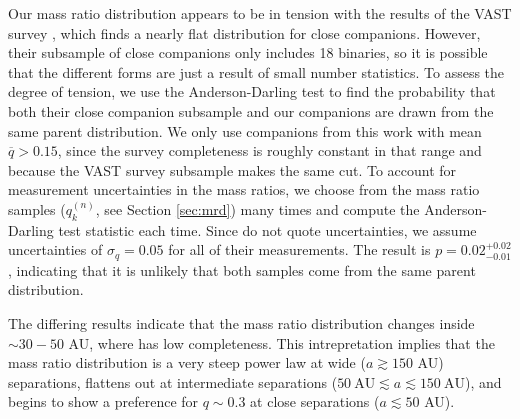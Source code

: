 \documentclass{emulateapj}
\begin{document}
Our mass ratio distribution appears to be in tension with the results of the VAST survey \citep{DeRosa2014}, which finds a nearly flat distribution for close companions. However, their subsample of close companions only includes 18 binaries, so it is possible that the different forms are just a result of small number statistics. To assess the degree of tension, we use the Anderson-Darling  test \citep{Anderson1954} to find the probability that both their close companion subsample and our companions are drawn from the same parent distribution. We only use companions from this work with mean $\overline{q} > 0.15$, since the survey completeness is roughly constant in that range and because the VAST survey subsample makes the same cut. To account for measurement uncertainties in the mass ratios, we choose from the mass ratio samples ($q_k^{(n)}$, see Section \ref{sec:mrd}) many times and compute the Anderson-Darling test statistic each time. Since \citet{DeRosa2014} do not quote uncertainties, we assume uncertainties of $\sigma_q = 0.05$ for all of their measurements. The result is $p = 0.02^{+0.02}_{-0.01}$, indicating that it is unlikely that both samples come from the same parent distribution.

The differing results indicate that the mass ratio distribution changes inside $\sim 30-50$ AU, where \citet{DeRosa2014} has low completeness. This intrepretation implies that the mass ratio distribution is a very steep power law at wide ($a \gtrsim 150$ AU) separations, flattens out at intermediate separations ($50\ \mathrm{AU} \lesssim a \lesssim 150\ \mathrm{AU}$), and begins to show a preference for $q \sim 0.3$ at close separations ($a \lesssim 50$ AU).



\end{document}
